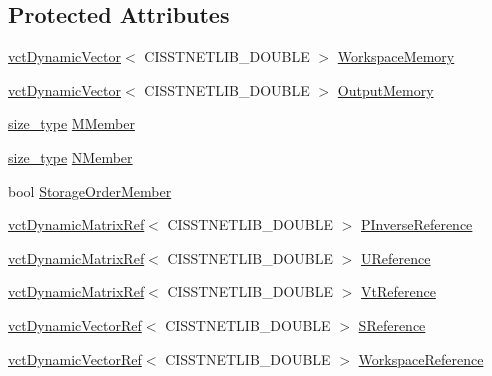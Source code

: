 \subsection*{Protected Attributes}
\begin{DoxyCompactItemize}
\item 
\hyperlink{classvct_dynamic_vector}{vct\+Dynamic\+Vector}$<$ C\+I\+S\+S\+T\+N\+E\+T\+L\+I\+B\+\_\+\+D\+O\+U\+B\+L\+E $>$ \hyperlink{classnmr_p_inverse_economy_dynamic_data_a8173778ec72de535c484ae4c4e67b5ad}{Workspace\+Memory}
\item 
\hyperlink{classvct_dynamic_vector}{vct\+Dynamic\+Vector}$<$ C\+I\+S\+S\+T\+N\+E\+T\+L\+I\+B\+\_\+\+D\+O\+U\+B\+L\+E $>$ \hyperlink{classnmr_p_inverse_economy_dynamic_data_acd646cf6e26e35d878c288e5ef92d066}{Output\+Memory}
\item 
\hyperlink{classnmr_p_inverse_economy_dynamic_data_a32ab8d601abf927292b49d0cea124f9b}{size\+\_\+type} \hyperlink{classnmr_p_inverse_economy_dynamic_data_a73a011df64f131734e80ea6bb651a15c}{M\+Member}
\item 
\hyperlink{classnmr_p_inverse_economy_dynamic_data_a32ab8d601abf927292b49d0cea124f9b}{size\+\_\+type} \hyperlink{classnmr_p_inverse_economy_dynamic_data_aac7c62f4358ca1de71b05bd69621793a}{N\+Member}
\item 
bool \hyperlink{classnmr_p_inverse_economy_dynamic_data_ad55d46196af57e35da890f204b503e6c}{Storage\+Order\+Member}
\end{DoxyCompactItemize}
{\bf }\par
\begin{DoxyCompactItemize}
\item 
\hyperlink{classvct_dynamic_matrix_ref}{vct\+Dynamic\+Matrix\+Ref}$<$ C\+I\+S\+S\+T\+N\+E\+T\+L\+I\+B\+\_\+\+D\+O\+U\+B\+L\+E $>$ \hyperlink{classnmr_p_inverse_economy_dynamic_data_a398e793024cec70ccadfa4ba192ac3f6}{P\+Inverse\+Reference}
\item 
\hyperlink{classvct_dynamic_matrix_ref}{vct\+Dynamic\+Matrix\+Ref}$<$ C\+I\+S\+S\+T\+N\+E\+T\+L\+I\+B\+\_\+\+D\+O\+U\+B\+L\+E $>$ \hyperlink{classnmr_p_inverse_economy_dynamic_data_ab63ec5055abd6748b0bf5dbc06b0ce54}{U\+Reference}
\item 
\hyperlink{classvct_dynamic_matrix_ref}{vct\+Dynamic\+Matrix\+Ref}$<$ C\+I\+S\+S\+T\+N\+E\+T\+L\+I\+B\+\_\+\+D\+O\+U\+B\+L\+E $>$ \hyperlink{classnmr_p_inverse_economy_dynamic_data_a4a703a5dc3284d415b43501202ed9274}{Vt\+Reference}
\item 
\hyperlink{classvct_dynamic_vector_ref}{vct\+Dynamic\+Vector\+Ref}$<$ C\+I\+S\+S\+T\+N\+E\+T\+L\+I\+B\+\_\+\+D\+O\+U\+B\+L\+E $>$ \hyperlink{classnmr_p_inverse_economy_dynamic_data_a4c1babef12716a337989755812b539cf}{S\+Reference}
\item 
\hyperlink{classvct_dynamic_vector_ref}{vct\+Dynamic\+Vector\+Ref}$<$ C\+I\+S\+S\+T\+N\+E\+T\+L\+I\+B\+\_\+\+D\+O\+U\+B\+L\+E $>$ \hyperlink{classnmr_p_inverse_economy_dynamic_data_a251cd42a2dcacbaa6920a08130026bf3}{Workspace\+Reference}
\end{DoxyCompactItemize}

